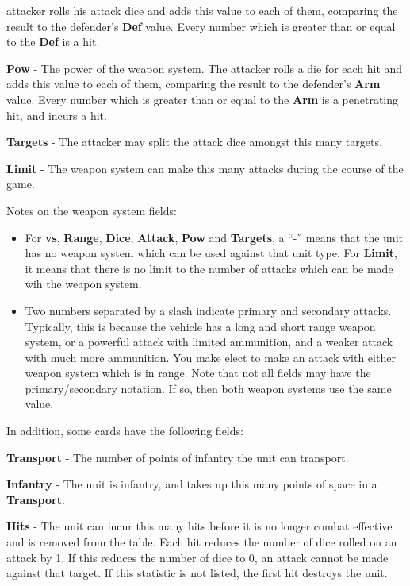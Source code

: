 \documentclass[12pt,titlepage]{article}
\begin{document}
\begin{multicols}{2}
\begin{description}
\begin{description}
        attacker rolls his attack dice and adds this value to each of
        them, comparing the result to the defender's {\bf Def}
        value. Every number which is greater than or equal to the {\bf
          Def} is a hit. 
      \item {\bf Pow} - The power of the weapon system. The attacker
        rolls a die for each hit and adds this value to each of them,
        comparing the result to the defender's {\bf Arm} value. Every
        number which is greater than or equal to the {\bf Arm} is a
        penetrating hit, and incurs a hit. 
      \item {\bf Targets} - The attacker may split the attack dice
        amongst this many targets.
      \item {\bf Limit} - The weapon system can make this many attacks
        during the course of the game.
      \end{description}
      
    \item Notes on the weapon system fields:
      \begin{itemize}
      \item For {\bf vs}, {\bf Range}, {\bf Dice}, {\bf Attack}, {\bf
        Pow} and {\bf Targets}, a ``-'' means that the unit has no
        weapon system which can be used against that unit type. For
        {\bf Limit}, it means that there is no limit to the number of
        attacks which can be made wih the weapon system.
      \item Two numbers separated by a slash indicate primary and
        secondary attacks. Typically, this is because the vehicle has
        a long and short range weapon system, or a powerful attack
        with limited ammunition, and a weaker attack with much more
        ammunition. You make elect to make an attack with either
        weapon system which is in range. Note that not all fields may
        have the primary/secondary notation. If so, then both weapon
        systems use the same value.
      \end{itemize}
    \end{description}

    In addition, some cards have the following fields:
    \begin{description}
      \item {\bf Transport} - The number of points of infantry the
        unit can transport.
      \item {\bf Infantry} - The unit is infantry, and takes up this
        many points of space in a {\bf Transport}.
      \item {\bf Hits} - The unit can incur this many hits before it
        is no longer combat effective and is removed from the
        table. Each hit reduces the number of dice rolled on an attack
        by 1. If this reduces the number of dice to 0, an attack
        cannot be made against that target. If this statistic is not
        listed, the first hit destroys the unit.
    \end{description}


\end{multicols}
\end{document}
